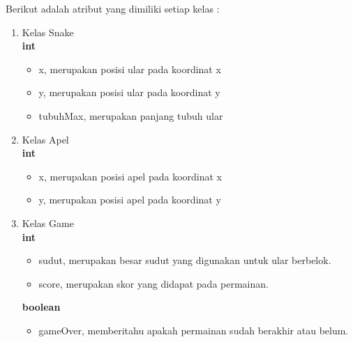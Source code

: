 Berikut adalah atribut yang dimiliki setiap kelas :

\begin{enumerate}
	\item Kelas Snake\\
\textbf{int}

\begin{itemize}
	\item x, merupakan posisi ular pada koordinat x
	\item y, merupakan posisi ular pada koordinat y
	\item tubuhMax, merupakan panjang tubuh ular
\end{itemize}

	\item Kelas Apel\\
	\textbf{int}
	
\begin{itemize}
	\item x, merupakan posisi apel pada koordinat x
	\item y, merupakan posisi apel pada koordinat y
\end{itemize}

\item Kelas Game \\
\textbf{int}

\begin{itemize}
	\item sudut, merupakan besar sudut yang digunakan untuk ular berbelok.
	\item score, merupakan skor yang didapat pada permainan.
\end{itemize}

\textbf{boolean}
\begin{itemize}
	\item gameOver, memberitahu apakah permainan sudah berakhir atau belum.
\end{itemize}

\end{enumerate}